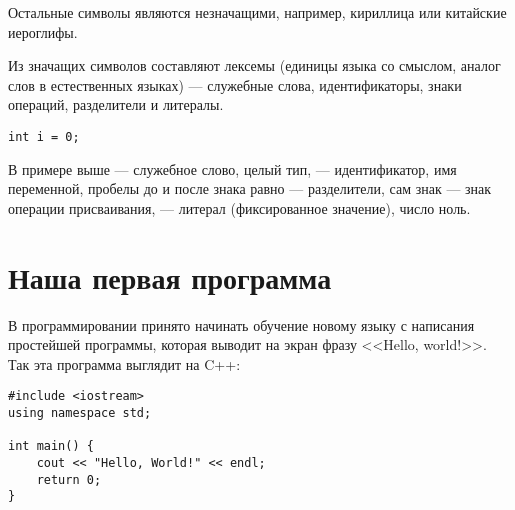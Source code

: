 \documentclass{article}
\begin{document}

Остальные символы являются незначащими, например, кириллица или китайские иероглифы.

Из значащих символов составляют лексемы (единицы языка со смыслом, аналог слов в естественных языках) --- служебные слова, идентификаторы, знаки операций, разделители и литералы.

\begin{lstlisting}[caption={Пример лексем}, captionpos=b, style=cpp]
int i = 0;
\end{lstlisting}

В примере выше  --- служебное слово, целый тип,  --- идентификатор, имя переменной, пробелы до и после знака равно --- разделители, сам знак \cppword{=} --- знак операции присваивания,  --- литерал (фиксированное значение), число ноль.


\section*{Наша первая программа}

В программировании принято начинать обучение новому языку с написания простейшей программы, которая выводит на экран фразу <<Hello, world!>>. Так эта программа выглядит на C++:

\begin{lstlisting}[caption={Наша первая программа <<Hello, world!>>}, captionpos=b, style=cpp]
#include <iostream>
using namespace std;

int main() {
	cout << "Hello, World!" << endl;
	return 0;
}
\end{lstlisting}
\end{document}
